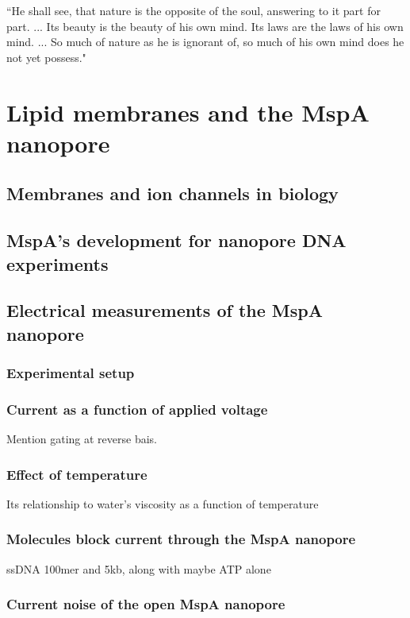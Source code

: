 \begin{savequote}[75mm]
``He shall see, that nature is the opposite of the soul, answering to it part for part. ... Its beauty is the beauty of his own mind. Its laws are the laws of his own mind. ... So much of nature as he is ignorant of, so much of his own mind does he not yet possess."
\end{savequote}

\chapter{Lipid membranes and the MspA nanopore}
\label{2_lipids_mspa}

\section{Membranes and ion channels in biology}

\section{MspA's development for nanopore DNA experiments}

\section{Electrical measurements of the MspA nanopore}

\subsection{Experimental setup}

\subsection{Current as a function of applied voltage}

Mention gating at reverse bais.

\subsection{Effect of temperature}

Its relationship to water's viscosity as a function of temperature

\subsection{Molecules block current through the MspA nanopore}

ssDNA 100mer and 5kb, along with maybe ATP alone

\subsection{Current noise of the open MspA nanopore}
